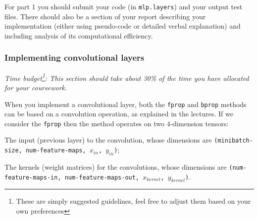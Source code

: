 \documentclass[11pt,]{article}
\begin{document}
For part 1 you should submit  your code (in \texttt{mlp.layers}) and your output test files. There should also be a section of your report describing your implementation (either using pseudo-code or detailed verbal explanation) and including analysis of its computational efficiency.

\subsubsection{Implementing convolutional layers}

\textit{Time budget\footnote{\label{footnote:time-budget} These are simply suggested guidelines, feel free to adjust them based on your own preferences}: This section should take about 30\% of the time you have allocated for your coursework.}\newline

When you implement a convolutional layer, both the \texttt{fprop} and \texttt{bprop} methods can be based on a convolution operation, as explained in the lectures. If we consider the  \texttt{fprop} then the method operates on two 4-dimension tensors:
\begin{compactitem}
    \item The input (previous layer) to the convolution, whose dimensions are \texttt{(minibatch-size, num-feature-maps, $x_{in}$, $y_{in}$)};
    \item The kernels (weight matrices) for the convolutions,  whose dimensions are \texttt{(num-feature-maps-in, num-feature-maps-out, $x_{kernel}$, $y_{kernel}$)}.
\end{compactitem}
\end{document}
